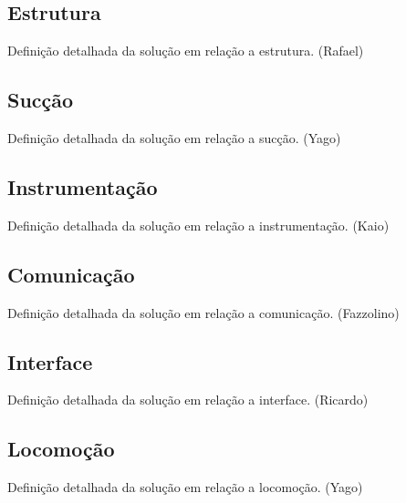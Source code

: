 \subsection{Estrutura} %
\label{sub:alimentação}
	Definição detalhada da solução em relação a estrutura. (Rafael)

\subsection{Sucção} %
\label{sub:aspirador}
	Definição detalhada da solução em relação a sucção. (Yago)

\subsection{Instrumentação} %
\label{sub:instrumentação}
	Definição detalhada da solução em relação a instrumentação. (Kaio)

\subsection{Comunicação} %
\label{sub:comunicação}
	Definição detalhada da solução em relação a comunicação. (Fazzolino)

\subsection{Interface} %
\label{sub:interface}
	Definição detalhada da solução em relação a interface. (Ricardo)

\subsection{Locomoção} %
\label{sub:locomoção}
	Definição detalhada da solução em relação a locomoção. (Yago)
